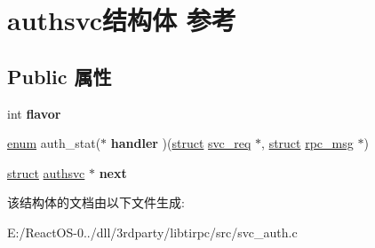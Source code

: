 \hypertarget{structauthsvc}{}\section{authsvc结构体 参考}
\label{structauthsvc}
\subsection*{Public 属性}
\begin{DoxyCompactItemize}
\item 
\mbox{\label{structauthsvc_a21c363f87ecd2a245688b30fcad5edbf}} 
int {\bfseries flavor}
\item 
\mbox{\label{structauthsvc_a481193446d0d05df9f7742c0ab1d5401}} 
\hyperlink{interfaceenum}{enum} auth\+\_\+stat($\ast$ {\bfseries handler} )(\hyperlink{interfacestruct}{struct} \hyperlink{structsvc__req}{svc\+\_\+req} $\ast$, \hyperlink{interfacestruct}{struct} \hyperlink{structrpc__msg}{rpc\+\_\+msg} $\ast$)
\item 
\mbox{\label{structauthsvc_a9970dc31ab5b9b311db003857e837d12}} 
\hyperlink{interfacestruct}{struct} \hyperlink{structauthsvc}{authsvc} $\ast$ {\bfseries next}
\end{DoxyCompactItemize}


该结构体的文档由以下文件生成\+:\begin{DoxyCompactItemize}
\item 
E\+:/\+React\+O\+S-\/0../dll/3rdparty/libtirpc/src/svc\+\_\+auth.\+c\end{DoxyCompactItemize}
